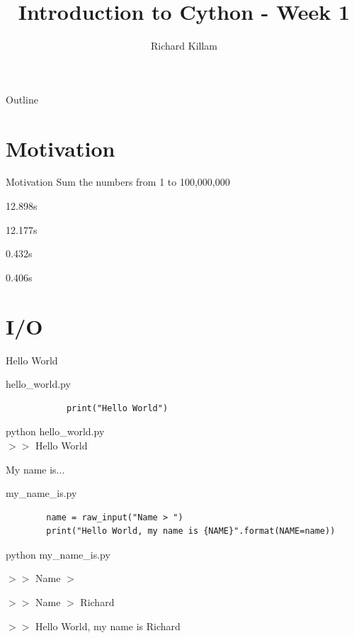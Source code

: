 \documentclass[11pt]{beamer}
\author{Richard Killam}
\title{Introduction to Cython - Week 1}
\newcommand{\emptyline}{$ $\\}
\begin{document}
\centering

\begin{frame}
	\titlepage
\end{frame}

\begin{frame}{Outline}
	\begin{multicols}{2}
		\tableofcontents
	\end{multicols}
\end{frame}

\section{Motivation}
\begin{frame}{Motivation}
	Sum the numbers from 1 to 100,000,000

	\begin{description}[style=multiline,topsep=10pt]
		\item[Python] 12.898s
		\item[Compiled Python] 12.177s
		\item[Cython] 0.432s
		\item[C] 0.406s
	\end{description}
\end{frame}

\section{I/O}
\begin{frame}[fragile]{Hello World}
	\begin{minipage}{0.45\linewidth}
		hello\_world.py
		\begin{lstlisting}
			print("Hello World")
		\end{lstlisting}
	\end{minipage}
	\pause
	\begin{minipage}{0.45\linewidth}
		python hello\_world.py
		\emptyline
		$>>$ Hello World
	\end{minipage}
\end{frame}

\begin{frame}[fragile]{My name is...}
	\raggedright
	my\_name\_is.py
	\begin{lstlisting}
		name = raw_input("Name > ")
		print("Hello World, my name is {NAME}".format(NAME=name))
	\end{lstlisting}

	\pause
	
	python my\_name\_is.py
	
	$>>$ Name $>$ 
	
	$>>$ Name $>$ Richard
	
	$>>$ Hello World, my name is Richard
	
\end{frame}
\end{document}
